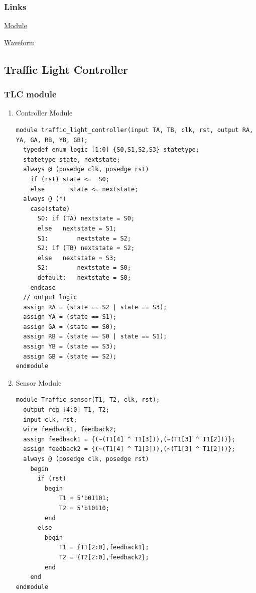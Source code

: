 \documentclass[11pt]{article}
\begin{document}
\subsubsection{Links}
\label{sec:org1ee2fed}

\href{https://www.edaplayground.com/x/3g3D}{Module}

\href{https://www.edaplayground.com/w/x/23g}{Waveform}
\subsection{Traffic Light Controller}
\label{sec:org1c013f0}
\subsubsection{TLC module}
\label{sec:org95daa6f}
\begin{enumerate}
\item Controller Module
\label{sec:orgd5487a8}
\begin{verbatim}
module traffic_light_controller(input TA, TB, clk, rst, output RA, YA, GA, RB, YB, GB);
  typedef enum logic [1:0] {S0,S1,S2,S3} statetype;
  statetype state, nextstate;
  always @ (posedge clk, posedge rst)
    if (rst) state <=  S0;
    else       state <= nextstate;
  always @ (*)
    case(state)
      S0: if (TA) nextstate = S0;
      else   nextstate = S1;
      S1:        nextstate = S2;
      S2: if (TB) nextstate = S2;
      else   nextstate = S3;
      S2:        nextstate = S0;
      default:   nextstate = S0;
    endcase
  // output logic
  assign RA = (state == S2 | state == S3);
  assign YA = (state == S1);
  assign GA = (state == S0);
  assign RB = (state == S0 | state == S1);
  assign YB = (state == S3);
  assign GB = (state == S2);
endmodule
\end{verbatim}
\item Sensor Module
\label{sec:org8b7a113}
\begin{verbatim}
module Traffic_sensor(T1, T2, clk, rst);
  output reg [4:0] T1, T2;
  input clk, rst;
  wire feedback1, feedback2;
  assign feedback1 = {(~(T1[4] ^ T1[3])),(~(T1[3] ^ T1[2]))};
  assign feedback2 = {(~(T1[4] ^ T1[3])),(~(T1[3] ^ T1[2]))};
  always @ (posedge clk, posedge rst)
    begin
      if (rst)
        begin
            T1 = 5'b01101;
            T2 = 5'b10110;
        end
      else
        begin
            T1 = {T1[2:0],feedback1};
            T2 = {T2[2:0],feedback2};
        end
    end
endmodule
\end{verbatim}
\end{enumerate}
\end{document}
